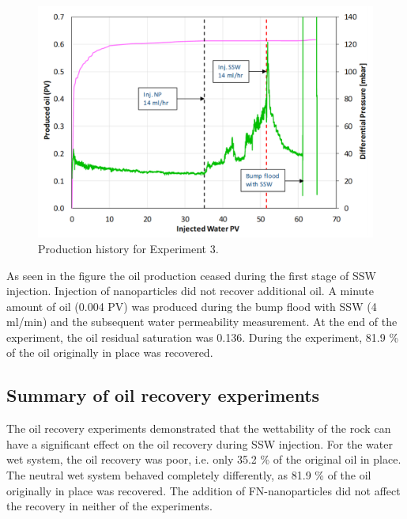 \begin{figure}[h!]
    \centering
    \includegraphics[width=\textwidth]{img/cht/prodexp3.png}
    \caption{Production history for Experiment 3.}
    \label{cht:prodexp3} %
\end{figure}

As seen in the figure the oil production ceased during the first stage of SSW injection. Injection of nanoparticles did not recover additional oil. A minute amount of oil (0.004 PV) was produced during the bump flood with SSW (4 ml/min) and the subsequent water permeability measurement. At the end of the experiment, the oil residual saturation was 0.136. During the experiment, 81.9 \% of the oil originally in place was recovered.

\subsection{Summary of oil recovery experiments}

The oil recovery experiments demonstrated that the wettability of the rock can have a significant effect on the oil recovery during SSW injection. For the water wet system, the oil recovery was poor, i.e. only 35.2 \% of the original oil in place. The neutral wet system behaved completely differently, as 81.9 \% of the oil originally in place was recovered. The addition of FN-nanoparticles did not affect the recovery in neither of the experiments.




